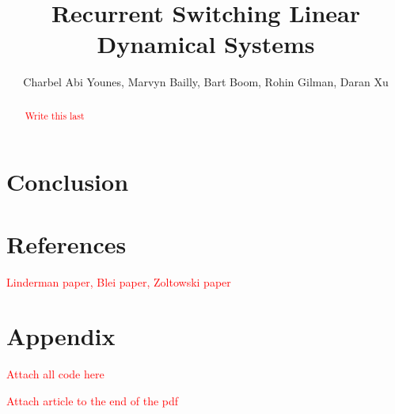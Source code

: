 \documentclass{amsart}
\title{Recurrent Switching Linear Dynamical Systems}
\author{Charbel Abi Younes, Marvyn Bailly, Bart Boom, Rohin Gilman, Daran Xu}
\date{}
\begin{document}
\begin{abstract}
	\textcolor{red}{Write this last}
\end{abstract}

\maketitle







\section{Conclusion}

\section{References}

\textcolor{red}{Linderman paper, Blei paper, Zoltowski paper}

\section{Appendix}

\textcolor{red}{Attach all code here}

\textcolor{red}{Attach article to the end of the pdf}
\end{document}
